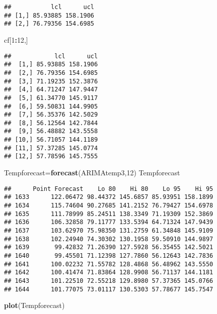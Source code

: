 \documentclass[
]{article}
\newenvironment{Shaded}{\begin{snugshade}}{\end{snugshade}}
\newcommand{\DecValTok}[1]{\textcolor[rgb]{0.00,0.00,0.81}{#1}}
\newcommand{\FunctionTok}[1]{\textcolor[rgb]{0.13,0.29,0.53}{\textbf{#1}}}
\newcommand{\NormalTok}[1]{#1}
\newcommand{\OtherTok}[1]{\textcolor[rgb]{0.56,0.35,0.01}{#1}}
\newcommand{\SpecialCharTok}[1]{\textcolor[rgb]{0.81,0.36,0.00}{\textbf{#1}}}
\begin{document}
\begin{verbatim}
##           lcl      ucl
## [1,] 85.93885 158.1906
## [2,] 76.79356 154.6985
\end{verbatim}

\begin{Shaded}
\begin{Highlighting}[]
\NormalTok{cf[}\DecValTok{1}\SpecialCharTok{:}\DecValTok{12}\NormalTok{,]}
\end{Highlighting}
\end{Shaded}

\begin{verbatim}
##            lcl      ucl
##  [1,] 85.93885 158.1906
##  [2,] 76.79356 154.6985
##  [3,] 71.19235 152.3876
##  [4,] 64.71247 147.9447
##  [5,] 61.34770 145.9117
##  [6,] 59.50831 144.9905
##  [7,] 56.35376 142.5029
##  [8,] 56.12564 142.7844
##  [9,] 56.48882 143.5558
## [10,] 56.71057 144.1189
## [11,] 57.37285 145.0774
## [12,] 57.78596 145.7555
\end{verbatim}

\begin{Shaded}
\begin{Highlighting}[]
\NormalTok{Tempforecast}\OtherTok{=}\FunctionTok{forecast}\NormalTok{(ARIMAtemp3,}\DecValTok{12}\NormalTok{)}
\NormalTok{Tempforecast}
\end{Highlighting}
\end{Shaded}

\begin{verbatim}
##      Point Forecast    Lo 80    Hi 80    Lo 95    Hi 95
## 1633      122.06472 98.44372 145.6857 85.93951 158.1899
## 1634      115.74604 90.27685 141.2152 76.79427 154.6978
## 1635      111.78999 85.24511 138.3349 71.19309 152.3869
## 1636      106.32858 79.11777 133.5394 64.71324 147.9439
## 1637      103.62970 75.98350 131.2759 61.34848 145.9109
## 1638      102.24940 74.30302 130.1958 59.50910 144.9897
## 1639       99.42832 71.26390 127.5928 56.35455 142.5021
## 1640       99.45501 71.12398 127.7860 56.12643 142.7836
## 1641      100.02232 71.55782 128.4868 56.48962 143.5550
## 1642      100.41474 71.83864 128.9908 56.71137 144.1181
## 1643      101.22510 72.55218 129.8980 57.37365 145.0766
## 1644      101.77075 73.01117 130.5303 57.78677 145.7547
\end{verbatim}

\begin{Shaded}
\begin{Highlighting}[]
\FunctionTok{plot}\NormalTok{(Tempforecast)}
\end{Highlighting}
\end{Shaded}
\end{document}

